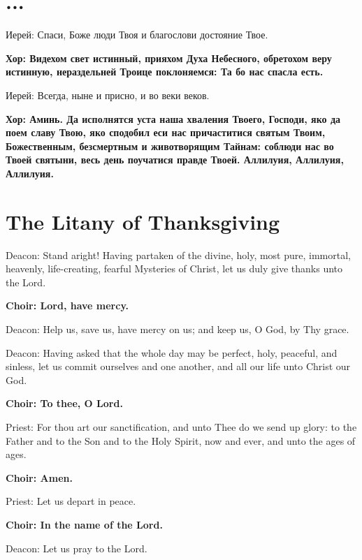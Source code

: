 \documentclass[12pt,a4paper,titlepage]{report}
\begin{document}
\begin{paracol}[1]{2}
	\section*{...}

	Иерей: Спаси, Боже люди Твоя и благослови достояние Твое.
	
    \textbf {Хор: Видехом свет истинный, прияхом Духа Небесного, обретохом веру истинную, нераздельней Троице поклоняемся: Та бо нас спасла есть.}
	
	Иерей: Всегда, ныне и присно, и во веки веков.
	
	\textbf {Хор: Аминь. Да исполнятся уста наша хваления Твоего, Господи, яко да поем славу Твою, яко сподобил еси нас причаститися святым Твоим, Божественным, безсмертным и животворящим Тайнам: соблюди нас во Твоей святыни, весь день поучатися правде Твоей. Аллилуия, Аллилуия, Аллилуия.}

    \switchcolumn[0]

	\section*{The Litany of Thanksgiving}

    Deacon: Stand aright! Having partaken of the divine, holy, most pure, immortal, heavenly, life-creating, fearful Mysteries of Christ, let us duly give thanks unto the Lord.

    \textbf {Choir: Lord, have mercy.}

    Deacon: Help us, save us, have mercy on us; and keep us, O God, by Thy grace.

    Deacon: Having asked that the whole day may be perfect, holy, peaceful, and sinless, let us commit ourselves and one another, and all our life unto Christ our God.

    \textbf {Choir: To thee, O Lord.}

    Priest: For thou art our sanctification, and unto Thee do we send up glory: to the Father and to the Son and to the Holy Spirit, now and ever, and unto the ages of ages.

    \textbf {Choir: Amen.}

    Priest: Let us depart in peace.

    \textbf {Choir: In the name of the Lord.}

    Deacon: Let us pray to the Lord.


\end{paracol}
\end{document}

